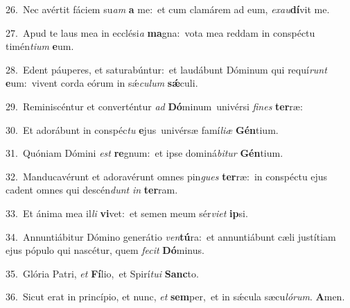 {\numbfont\textcolor{\numbcolor}{26.}}~Nec avértit fáciem su\textit{am} \textbf{a} me:~\star et cum clamárem ad eum, \textit{ex}\-\textit{au}\textbf{dí}vit me.\par
{\numbfont\textcolor{\numbcolor}{27.}}~Apud te laus mea in ecclési\textit{a} \textbf{ma}\-gna:~\star vota mea reddam in conspéctu timén\-\textit{ti}\-\textit{um} \textbf{e}\-um.\par
{\numbfont\textcolor{\numbcolor}{28.}}~Edent páuperes, et saturabúntur:~\dagger et laudábunt Dóminum qui requí\textit{runt} \textbf{e}\-um:~\star vivent corda eórum in sǽ\-\textit{cu}\-\textit{lum} \textbf{sǽ}\-culi.\par
{\numbfont\textcolor{\numbcolor}{29.}}~Reminiscéntur et converténtur \textit{ad} \textbf{Dó}\-minum~\star univérsi \textit{fi}\-\textit{nes} \textbf{ter}\-ræ:\par
{\numbfont\textcolor{\numbcolor}{30.}}~Et adorábunt in conspéc\textit{tu} \textbf{e}\-jus~\star univérsæ famí\-\textit{li}\-\textit{æ} \textbf{Gén}\-tium.\par
{\numbfont\textcolor{\numbcolor}{31.}}~Quóniam Dómini \textit{est} \textbf{re}\-gnum:~\star et ipse dominá\-\textit{bi}\-\textit{tur} \textbf{Gén}\-tium.\par
{\numbfont\textcolor{\numbcolor}{32.}}~Manducavérunt et adoravérunt omnes pin\textit{gues} \textbf{ter}\-ræ:~\star in conspéctu ejus cadent omnes qui descén\textit{dunt} \textit{in} \textbf{ter}\-ram.\par
{\numbfont\textcolor{\numbcolor}{33.}}~Et ánima mea il\textit{li} \textbf{vi}\-vet:~\star et semen meum sér\-\textit{vi}\-\textit{et} \textbf{ip}\-si.\par
{\numbfont\textcolor{\numbcolor}{34.}}~Annuntiábitur Dómino generátio \textit{ven}\-\textbf{tú}ra:~\star et annuntiábunt cæli justítiam ejus pópulo qui nascétur, quem \textit{fe}\-\textit{cit} \textbf{Dó}\-minus.\par
{\numbfont\textcolor{\numbcolor}{35.}}~Glória Patri, \textit{et} \textbf{Fí}\-lio,~\star et Spirí\-\textit{tu}\-\textit{i} \textbf{Sanc}\-to.\par
{\numbfont\textcolor{\numbcolor}{36.}}~Sicut erat in princípio, et nunc, \textit{et} \textbf{sem}\-per,~\star et in sǽcula sæcu\-\textit{ló}\-\textit{rum}. \textbf{A}\-men.\par
